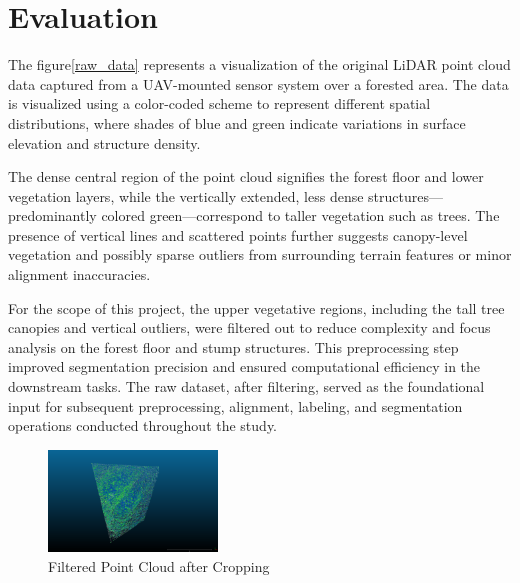 \documentclass[../report.tex]{subfiles}
\begin{document}
\section{Evaluation}
\label{sec:evaluation}
    
    The figure\ref{raw_data} represents a visualization of the original LiDAR point cloud data captured from a UAV-mounted sensor system over a forested area. The data is visualized using a color-coded scheme to represent different spatial distributions, where shades of blue and green indicate variations in surface elevation and structure density.
    
    The dense central region of the point cloud signifies the forest floor and lower vegetation layers, while the vertically extended, less dense structures—predominantly colored green—correspond to taller vegetation such as trees. The presence of vertical lines and scattered points further suggests canopy-level vegetation and possibly sparse outliers from surrounding terrain features or minor alignment inaccuracies.
    
    For the scope of this project, the upper vegetative regions, including the tall tree canopies and vertical outliers, were filtered out to reduce complexity and focus analysis on the forest floor and stump structures. This preprocessing step improved segmentation precision and ensured computational efficiency in the downstream tasks. The raw dataset, after filtering, served as the foundational input for subsequent preprocessing, alignment, labeling, and segmentation operations conducted throughout the study.
\begin{figure}[H]
    \centering
    \includegraphics[width=0.4\textwidth]{rnd-project-report-main/figures/filtered_point_cloud.png}
    \caption{Filtered Point Cloud after Cropping}
\end{figure}
\end{document}
